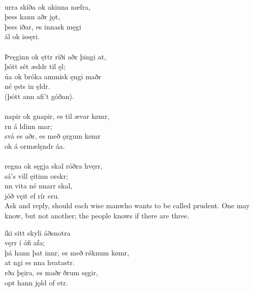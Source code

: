  \\

\bva {}urra skíða \hld ok akinna næfra, \\%
\ind þess kann aðr jǫt, \\%
þess iðar, \hld es innask męgi \\%
\ind {}ál ok issęri.\\%

 \\

\bva Þvęginn ok ęttr \hld ríði aðr þingi at, \\%
\ind þótt sét æddr til ęl; \\%
úa ok bróka \hld {}ammisk ęngi maðr \\%
\ind né ęsts in ęldr. \\%
\ind (þótt ann afi't góðan).\\%

 \\

\bva {}napir ok gnapir, \hld es til ævar kømr, \\%
\ind {}rn á ldinn mar; \\%
svá es aðr, \hld es með ǫrgum kømr \\%
\ind ok á ormælęndr áa.\\%

 \\

\bva {}regna ok sęgja \hld skal róðra hvęrr, \\%
\ind sá's vill ęitinn orskr; \\%
nn vita \hld né nnarr skal, \\%
\ind {}jóð vęit ef rír eru.\\%

\bvb Ask and reply, should each wise man\footnotemark[70] who wants to be called prudent. One may know, but not another; the people knows if there are three. \\

\bva {}íki sitt \hld skyli áðsnotra \\%
\ind {}vęrr í ófi afa; \\%
þá hann þat innr, \hld es með rǿknum kømr, \\%
\ind at ngi es nna hvatastr. \\%
rða þęira, \hld es maðr ðrum sęgir, \\%
\ind opt hann jǫld of etr.\\%


